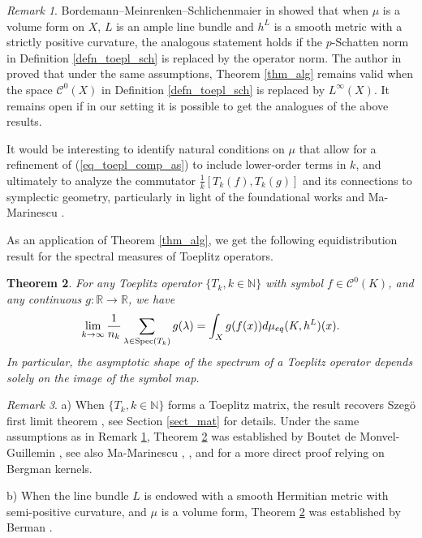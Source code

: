 \documentclass[12pt]{article}
\numberwithin{equation}{section}
\theoremstyle{theorem}
\newtheorem{thm}{Theorem}[section]
\theoremstyle{definition}
\theoremstyle{remark}
\newtheorem{rem}[thm]{Remark}
\newcommand{\real}{\mathbb{R}}
\newcommand{\nat}{\mathbb{N}}
\newcommand{\ccal}{\mathscr{C}}
\begin{document}
	\begin{rem}\label{rem_alg}
	 	Bordemann–Meinrenken–Schlichenmaier in \cite{BordMeinSchli} showed that when $\mu$ is a volume form on $X$, $L$ is an ample line bundle and $h^L$ is a smooth metric with a strictly positive curvature, the analogous statement holds if the $p$-Schatten norm in Definition \ref{defn_toepl_sch} is replaced by the operator norm. 
	 	The author in \cite{FinSubmToepl} proved that under the same assumptions, Theorem \ref{thm_alg} remains valid when the space $\mathcal{C}^0(X)$ in Definition \ref{defn_toepl_sch} is replaced by $L^\infty(X)$.
	 	It remains open if in our setting it is possible to get the analogues of the above results. 
	\end{rem}
	It would be interesting to identify natural conditions on $\mu$ that allow for a refinement of (\ref{eq_toepl_comp_as}) to include lower-order terms in $k$, and ultimately to analyze the commutator $\frac{1}{k} [T_k(f), T_k(g)]$ and its connections to symplectic geometry, particularly in light of the foundational works \cite{BordMeinSchli} and Ma-Marinescu \cite{MaMarBTKah}.
	\par 
	As an application of Theorem \ref{thm_alg}, we get the following equidistribution result for the spectral measures of Toeplitz operators.
	\begin{thm}\label{thm_distr}
		For any Toeplitz operator $\{ T_k, k \in \nat \}$ with symbol $f \in \ccal^0(K)$, and any continuous $g: \real \to \real$, we have
		\begin{equation}
			\lim_{k \to \infty} \frac{1}{n_k} \sum_{\lambda \in {\rm{Spec}} (T_k)} g(\lambda)
			=
			\int_X g(f(x)) d \mu_{eq}(K, h^L)(x).
		\end{equation}
		In particular, the asymptotic shape of the spectrum of a Toeplitz operator depends solely on the image of the symbol map.
	\end{thm}
	\begin{rem}
		a) When $\{ T_k, k \in \nat \}$ forms a Toeplitz matrix, the result recovers Szeg\"o first limit theorem \cite{SzegoFST}, see Section \ref{sect_mat} for details.
		Under the same assumptions as in Remark \ref{rem_alg}, Theorem \ref{thm_distr} was established by Boutet de Monvel-Guillemin \cite{BoutGuillSpecToepl}, see also Ma-Marinescu \cite{MaMarinGeneralizedBK}, \cite{MaMarBTKah}, \cite[\S 7]{MaHol} and \cite[Appendix A]{FinMaVol} for a more direct proof relying on Bergman kernels.
		\par 
		b) When the line bundle $L$ is endowed with a smooth Hermitian metric with semi-positive curvature, and $\mu$ is a volume form, Theorem \ref{thm_distr} was established by Berman \cite[Theorem 2.7]{BermanSuperToepl}.
	\end{rem}
\end{document}

